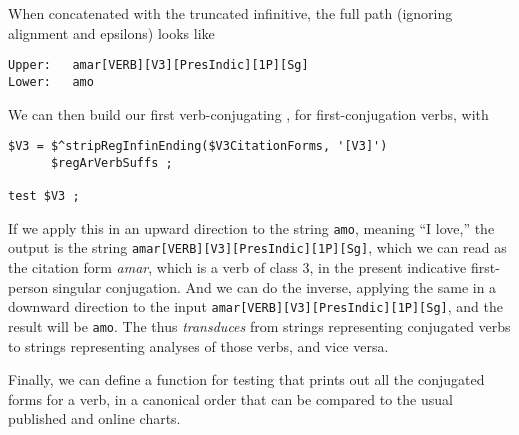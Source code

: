 \noindent
When concatenated with the truncated infinitive, the full path (ignoring alignment and epsilons) looks like

\begin{Verbatim}
Upper:   amar[VERB][V3][PresIndic][1P][Sg]
Lower:   amo
\end{Verbatim}

We can then build our first verb-conjugating \fsm{}, for first-conjugation verbs,  with


\begin{Verbatim}
$V3 = $^stripRegInfinEnding($V3CitationForms, '[V3]')
      $regArVerbSuffs ;

test $V3 ;
\end{Verbatim}


If we apply this \fsm{} in an upward direction to the string \texttt{amo}, meaning
``I love,'' the output is the string \texttt{amar[VERB][V3][PresIndic][1P][Sg]},
which we can read as the citation form \emph{amar}, which is a verb of
class 3, in the present indicative first-person singular conjugation.
And we can do the inverse, applying the same \fsm{} in a downward direction to
the input \texttt{amar[VERB][V3][PresIndic][1P][Sg]}, and the result will be
\texttt{amo}.  The \fsm{} thus \emph{transduces} from strings representing conjugated
verbs to strings representing analyses of those verbs, and vice versa.

Finally, we can define a function for testing that prints out all the conjugated forms for a
verb, in a canonical order that can be compared to the usual published and
online charts.


